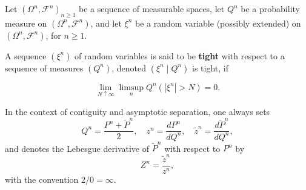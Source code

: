 Let $(\Omega^n, \mathcal{F}^n)_{n \geq 1}$ be a sequence of measurable spaces, let $Q^n$ be a probability measure on $(\Omega^n, \mathcal{F}^n)$, and let $\xi^n$ be a random variable (possibly extended) on $(\Omega^n, \mathcal{F}^n)$, for $n \geq 1$.

A sequence $(\xi^n)$ of random variables is said to be \textbf{tight} with respect to a sequence of measures $(Q^n)$, denoted $(\xi^n \mid Q^n)$ is tight, if

$$\lim_{N \uparrow \infty} \limsup_n Q^n(|\xi^n| > N) = 0.$$

In the context of contiguity and asymptotic separation, one always sets
$$Q^n = \frac{P^n + \tilde{P}^n}{2}, \quad z^n = \frac{dP^n}{dQ^n}, \quad \tilde{z}^n = \frac{d\tilde{P}^n}{dQ^n},$$
and denotes the Lebesgue derivative of $\tilde{P}^n$ with respect to $P^n$ by
$$Z^n = \frac{\tilde{z}^n}{z^n},$$
with the convention $2/0 = \infty$.
